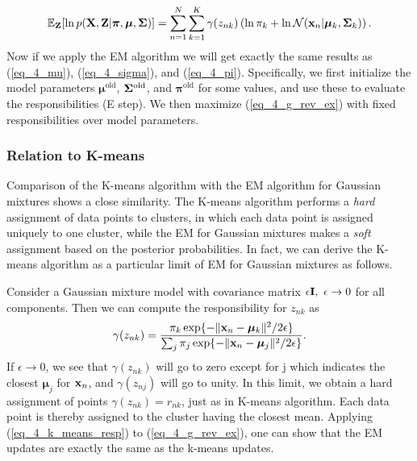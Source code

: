 \documentclass[../main.tex]{subfiles}
\begin{document}
\begin{equation}\label{eq_4_g_rev_ex}
\mathbb{E}_{\bf Z}[\ln p({\bf X,Z}|\bm{\pi},\bm{\mu},{\bf \Sigma})] =  \sum_{n=1}^{N}\sum_{k=1}^{K} \gamma(z_{nk})\left(\ln \pi_k +\ln \mathcal{N}({\bf x}_n|\bm{\mu}_k,{\bf \Sigma}_k)\right).
\end{equation}
Now if we apply the EM algorithm we will get exactly the same results as (\ref{eq_4_mu}), (\ref{eq_4_sigma}), and (\ref{eq_4_pi}). Specifically, we first initialize the model parameters $\bm{\mu}^{\text{old}}$, ${\bf \Sigma}^{\text{old}}$, and $\bm{\pi}^{\text{old}}$ for some values, and use these to evaluate the responsibilities (E step). We then maximize (\ref{eq_4_g_rev_ex}) with fixed responsibilities over model parameters.
\subsubsection{Relation to K-means}
Comparison of the K-means algorithm with the EM algorithm for Gaussian mixtures shows a close similarity. The K-means algorithm performs a \emph{hard} assignment of data points to clusters, in which each data point is assigned uniquely to one cluster, while the EM for Gaussian mixtures makes a \emph{soft} assignment based on the posterior probabilities. In fact, we can derive the K-means algorithm as a particular limit of EM for Gaussian mixtures as follows.
\par Consider a Gaussian mixture model with covariance matrix $\epsilon {\bf I},\ \epsilon\rightarrow 0$ for all components. Then we can compute the responsibility for $z_{nk}$ as
\begin{equation}\label{eq_4_k_means_resp}
\gamma(z_{nk}) = \frac{\pi_k \exp\{-\|{\bf x}_n - \bm{\mu}_k\|^2/2\epsilon\}}
{\sum_j \pi_j \exp\{-\|{\bf x}_n - \bm{\mu}_j\|^2/2\epsilon\}}.
\end{equation}
If $\epsilon\rightarrow 0$, we see that $\gamma(z_{nk})$ will go to zero except for j which indicates the closest $\bm{\mu}_j$ for ${\bf x}_n$, and $\gamma(z_{nj})$ will go to unity. In this limit, we obtain a hard assignment of points $\gamma(z_{nk})=r_{nk}$, just as in K-means algorithm. Each data point is thereby assigned to the cluster having the closest mean. Applying (\ref{eq_4_k_means_resp}) to (\ref{eq_4_g_rev_ex}), one can show that the EM updates are exactly the same as the k-means updates.
\end{document}
